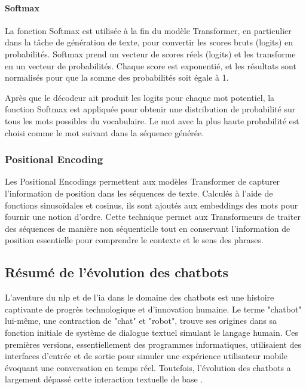 \paragraph{Softmax} \hspace{0pt}

La fonction Softmax est utilisée à la fin du modèle Transformer, en particulier dans la tâche de génération de texte, pour convertir les scores bruts (logits) en probabilités. Softmax prend un vecteur de scores réels (logits) et les transforme en un vecteur de probabilités. Chaque score est exponentié, et les résultats sont normalisés pour que la somme des probabilités soit égale à 1.

Après que le décodeur ait produit les logits pour chaque mot potentiel, la fonction Softmax est appliquée pour obtenir une distribution de probabilité sur tous les mots possibles du vocabulaire. Le mot avec la plus haute probabilité est choisi comme le mot suivant dans la séquence générée.

\subsubsection{Positional Encoding}

Les Positional Encodings permettent aux modèles Transformer de capturer l'information de position dans les séquences de texte. Calculés à l'aide de fonctions sinusoïdales et cosinus, ils sont ajoutés aux embeddings des mots pour fournir une notion d'ordre. Cette technique permet aux Transformeurs de traiter des séquences de manière non séquentielle tout en conservant l'information de position essentielle pour comprendre le contexte et le sens des phrases.

\newpage
\subsection{Résumé de l'évolution des chatbots}
\label{ch:1:section:history}

L'aventure du \acf{nlp} et de l'\acf{ia} dans le domaine des chatbots est une histoire captivante de progrès technologique et d'innovation humaine. Le terme "chatbot" lui-même, une contraction de "chat" et "robot", trouve ses origines dans sa fonction initiale de système de dialogue textuel simulant le langage humain. Ces premières versions, essentiellement des programmes informatiques, utilisaient des interfaces d'entrée et de sortie pour simuler une expérience utilisateur mobile évoquant une conversation en temps réel. Toutefois, l'évolution des chatbots a largement dépassé cette interaction textuelle de base \cite{alamin2024history}.

